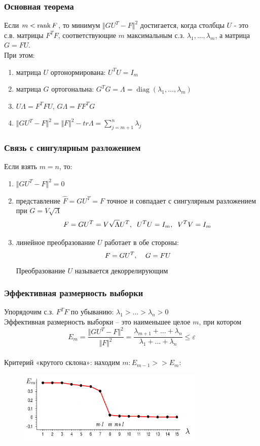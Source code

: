 \documentclass[10pt]{beamer}
\begin{document}
\begin{frame}\frametitle{Основная теорема}
Если $m < \operatorname{rank} F$, то минимум $\Vert GU^T - F \Vert^2$ достигается, когда столбцы $U$ - это с.в. матрицы $F^TF$, соответствующие $m$ максимальным с.з. $\lambda_1,\dots, \lambda_m$, а матрица $G = FU$.\\
\vspace{5mm}
При этом:\\
\begin{enumerate}[--]
\item матрица $U$ ортонормирована: $U^TU = I_m$
\item матрица $G$ ортогональна: $G^TG = \Lambda = \operatorname{diag}(\lambda_1, \dots, \lambda_m)$
\item $U\Lambda = F^TFU$,  $G\Lambda = FF^TG$
\item $\Vert GU^T - F \Vert^2 = \Vert F \Vert^2 - tr \Lambda = \sum\limits_{j=m+1}^n \lambda_j$
\end{enumerate}

\end{frame}

\begin{frame}\frametitle{Связь с сингулярным разложением}
Если взять $m = n$, то:\\
\begin{enumerate}[--]
\item $\Vert GU^T - F \Vert^2 = 0$
\item представление $\hat{F} = GU^T = F$ точное и совпадает с сингулярным разложением при $G = V \sqrt{\Lambda}$
$$F = GU^T = V\sqrt{\Lambda}U^T, \hspace{2mm} U^TU = I_m, \hspace{2mm} V^TV = I_m$$
\item линейное преобразование $U$ работает в обе стороны:\\
$$F= GU^T, \hspace{4mm} G=FU$$
Преобразование $U$ называется декоррелирующим
\end{enumerate}
\end{frame}

\begin{frame}\frametitle{Эффективная размерность выборки}
Упорядочим с.з. $F^TF$ по убыванию: $\lambda_1 > \dots > \lambda_n > 0$\\
Эффективная размерность выборки -- это наименьшее целое $m$, при котором\\
$$E_m = \frac{\Vert GU^T - F \Vert^2}{\Vert F \Vert^2} = \frac{\lambda_{m+1} + \dots + \lambda_{n}}{\lambda_1 + \dots + \lambda_n} \leq \varepsilon$$\\
Критерий «крутого склона»: находим $m: E_{m-1} >> E_m$:
\begin{figure}[htbp]
  \includegraphics[height=100pt, keepaspectratio = true]{images/edge}   
\end{figure}
\end{frame}
\end{document}

